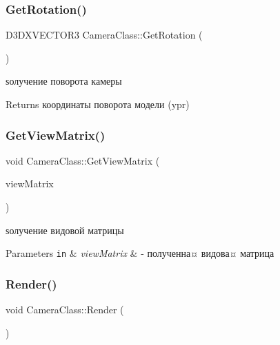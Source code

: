 \subsubsection{\texorpdfstring{Get\+Rotation()}{GetRotation()}}
{\footnotesize\ttfamily D3\+D\+X\+V\+E\+C\+T\+O\+R3 Camera\+Class\+::\+Get\+Rotation (\begin{DoxyParamCaption}{ }\end{DoxyParamCaption})}



ѕолучение поворота камеры 

\begin{DoxyReturn}{Returns}
координаты поворота модели (ypr) 
\end{DoxyReturn}
\mbox{\label{class_camera_class_a62f762b7c869ee03ac0236648cd0767c}} 
\subsubsection{\texorpdfstring{Get\+View\+Matrix()}{GetViewMatrix()}}
{\footnotesize\ttfamily void Camera\+Class\+::\+Get\+View\+Matrix (\begin{DoxyParamCaption}\item[{D3\+D\+X\+M\+A\+T\+R\+IX \&}]{view\+Matrix }\end{DoxyParamCaption})}



ѕолучение видовой матрицы 


\begin{DoxyParams}[1]{Parameters}
\mbox{\tt in}  & {\em view\+Matrix} & -\/ полученна¤ видова¤ матрица \\
\hline
\end{DoxyParams}
\mbox{\label{class_camera_class_aa45890afd771cf300257d29b0868612f}} 
\subsubsection{\texorpdfstring{Render()}{Render()}}
{\footnotesize\ttfamily void Camera\+Class\+::\+Render (\begin{DoxyParamCaption}{ }\end{DoxyParamCaption})}



